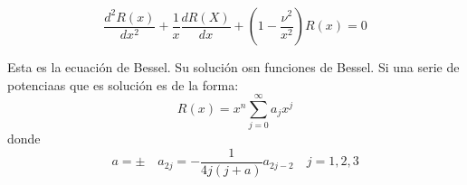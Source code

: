 \documentclass{article}
\begin{document}
\begin{equation}
    \frac{d^2 R(x)}{dx^2} + \frac{1}{x}\frac{dR(X)}{dx} + \left(1 - \frac{\nu^2}{x^2} \right) R(x) = 0
\end{equation}

Esta es la ecuación de Bessel. Su solución osn funciones de Bessel. Si una serie de potenciaas que es solución es de la forma:
\begin{equation}
R(x) = x^n \sum_{j = 0}^{\infty} a_j x^j
\end{equation}
donde
\begin{equation}
 a =\pm \quad a_{2j} = -\frac{1}{4j(j+a)}a_{2j-2}\quad j = 1, 2, 3   
\end{equation}
\end{document}
